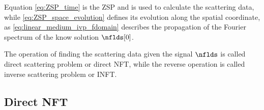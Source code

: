 Equation \eqref{eq:ZSP_time} is the \ac{ZSP} and is used to calculate the scattering data, while
\eqref{eq:ZSP_space_evolution} defines its evolution along the spatial coordinate, as \eqref{eq:linear_medium_ivp_fdomain} describes the propagation of the
Fourier spectrum of the know solution $\nflds[0]$.

%


The operation of finding the scattering data given the signal $\nflds$
is called direct scattering problem or direct \ac{NFT}, while the reverse
operation is called inverse scattering problem or \ac{INFT}.

\subsection{Direct \acl{NFT}}\label{sec:direct_NFT_NLSE}

